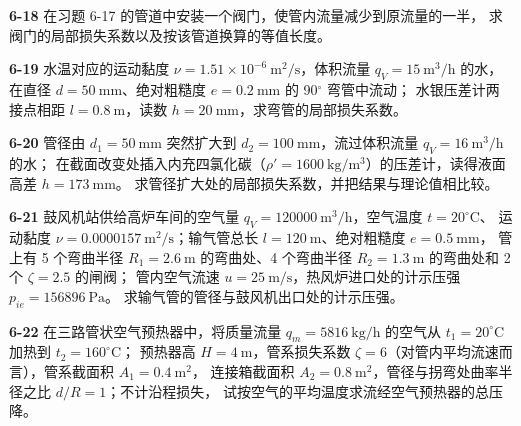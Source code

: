 \begin{ti}
\item[\textbf{6-18}] 在习题 6-17 的管道中安装一个阀门，使管内流量减少到原流量的一半，
求阀门的局部损失系数以及按该管道换算的等值长度。
\quad{}\quad{}

\item[\textbf{6-19}] 水温对应的运动黏度 $\nu=1.51\times10^{-6}\ \mathrm{m^2/s}$，体积流量 $q_V=15\ \mathrm{m^3/h}$ 的水，
在直径 $d=50\ \mathrm{mm}$、绝对粗糙度 $e=0.2\ \mathrm{mm}$ 的 90$^\circ$ 弯管中流动；
水银压差计两接点相距 $l=0.8\ \mathrm{m}$，读数 $h=20\ \mathrm{mm}$，求弯管的局部损失系数。
\quad{}\quad{}

\item[\textbf{6-20}] 管径由 $d_1=50\ \mathrm{mm}$ 突然扩大到 $d_2=100\ \mathrm{mm}$，流过体积流量 $q_V=16\ \mathrm{m^3/h}$ 的水；
在截面改变处插入内充四氯化碳（$\rho'=1600\ \mathrm{kg/m^3}$）的压差计，读得液面高差 $h=173\ \mathrm{mm}$。
求管径扩大处的局部损失系数，并把结果与理论值相比较。
\quad{}\quad{}

\item[\textbf{6-21}] 鼓风机站供给高炉车间的空气量 $q_V=120000\ \mathrm{m^3/h}$，空气温度 $t=20^\circ\mathrm{C}$、
运动黏度 $\nu=0.0000157\ \mathrm{m^2/s}$；输气管总长 $l=120\ \mathrm{m}$、绝对粗糙度 $e=0.5\ \mathrm{mm}$，
管上有 5 个弯曲半径 $R_1=2.6\ \mathrm{m}$ 的弯曲处、4 个弯曲半径 $R_2=1.3\ \mathrm{m}$ 的弯曲处和 2 个 $\zeta=2.5$ 的闸阀；
管内空气流速 $u=25\ \mathrm{m/s}$，热风炉进口处的计示压强 $p_{ie}=156896\ \mathrm{Pa}$。
求输气管的管径与鼓风机出口处的计示压强。
\quad{}\quad{}

\item[\textbf{6-22}] 在三路管状空气预热器中，将质量流量 $q_m=5816\ \mathrm{kg/h}$ 的空气从 $t_1=20^\circ\mathrm{C}$ 加热到 $t_2=160^\circ\mathrm{C}$；
预热器高 $H=4\ \mathrm{m}$，管系损失系数 $\zeta=6$（对管内平均流速而言），管系截面积 $A_1=0.4\ \mathrm{m^2}$，
连接箱截面积 $A_2=0.8\ \mathrm{m^2}$，管径与拐弯处曲率半径之比 $d/R=1$；不计沿程损失，
试按空气的平均温度求流经空气预热器的总压降。
\quad{}\quad{}


\end{ti}
